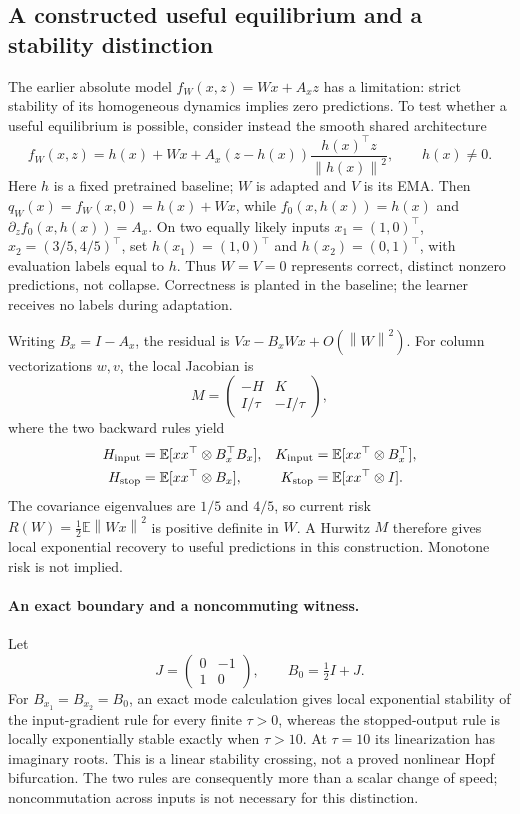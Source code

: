 \documentclass[11pt,a4paper]{article}
\newcommand{\E}{\mathbb{E}}
\newcommand{\norm}[1]{\left\lVert #1\right\rVert}
\begin{document}
\subsection{A constructed useful equilibrium and a stability distinction}
The earlier absolute model $f_W(x,z)=Wx+A_xz$ has a limitation: strict
stability of its homogeneous dynamics implies zero predictions. To test
whether a useful equilibrium is possible, consider instead the smooth
shared architecture
\begin{equation}
 f_W(x,z)=h(x)+Wx+
 A_x(z-h(x))\frac{h(x)^\top z}{\norm{h(x)}^2},
 \qquad h(x)\ne0.
 \label{eq:realization}
\end{equation}
Here $h$ is a fixed pretrained baseline; $W$ is adapted and $V$ is its EMA.
Then $q_W(x)=f_W(x,0)=h(x)+Wx$, while $f_0(x,h(x))=h(x)$ and
$\partial_z f_0(x,h(x))=A_x$. On two equally likely inputs
$x_1=(1,0)^\top$, $x_2=(3/5,4/5)^\top$, set
$h(x_1)=(1,0)^\top$ and $h(x_2)=(0,1)^\top$, with evaluation labels
equal to $h$. Thus $W=V=0$ represents correct, distinct nonzero
predictions, not collapse. Correctness is planted in the baseline;
the learner receives no labels during adaptation.

Writing $B_x=I-A_x$, the residual is
$Vx-B_xWx+O(\norm{W}^2)$. For column vectorizations $w,v$, the local
Jacobian is
\begin{equation}
 M=\begin{pmatrix}-H&K\\I/\tau&-I/\tau\end{pmatrix},
 \label{eq:block}
\end{equation}
where the two backward rules yield
\begin{align}
 H_{\rm input}&=\E[xx^\top\otimes B_x^\top B_x],&
 K_{\rm input}&=\E[xx^\top\otimes B_x^\top],\nonumber\\
 H_{\rm stop}&=\E[xx^\top\otimes B_x],&
 K_{\rm stop}&=\E[xx^\top\otimes I].
 \label{eq:blocks}
\end{align}
The covariance eigenvalues are $1/5$ and $4/5$, so current risk
$R(W)=\tfrac12\E\norm{Wx}^2$ is positive definite in $W$.
A Hurwitz $M$ therefore gives local exponential recovery to useful
predictions in this construction. Monotone risk is not implied.

\paragraph{An exact boundary and a noncommuting witness.}
Let
\[
 J=\begin{pmatrix}0&-1\\1&0\end{pmatrix},\qquad B_0=\tfrac12 I+J.
\]
For $B_{x_1}=B_{x_2}=B_0$, an exact mode calculation gives local
exponential stability of the input-gradient rule for every finite
$\tau>0$, whereas the stopped-output rule is locally exponentially
stable exactly when $\tau>10$. At $\tau=10$ its linearization has
imaginary roots. This is a linear stability crossing, not a proved
nonlinear Hopf bifurcation. The two rules are consequently more than
a scalar change of speed; noncommutation across inputs is not necessary
for this distinction.
\end{document}
